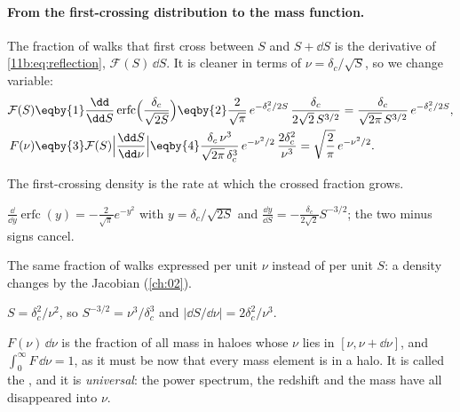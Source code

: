 \paragraph{From the first-crossing distribution to the mass function.}
The fraction of walks that first cross between $S$ and $S+\dd S$ is the derivative
of \eqref{11b:eq:reflection}, $\mathcal F(S)\,\dd S$. It is cleaner in terms of
$\nu=\delta_c/\sqrt S$, so we change variable:
\begin{align}
  \mathcal F(S)
  &\eqby{1}\frac{\dd}{\dd S}\operatorname{erfc}\Bigl(\frac{\delta_c}{\sqrt{2S}}\Bigr)
   \eqby{2}\frac{2}{\sqrt\pi}\,e^{-\delta_c^2/2S}\,
     \frac{\delta_c}{2\sqrt2\,S^{3/2}}
   =\frac{\delta_c}{\sqrt{2\pi}\,S^{3/2}}\,e^{-\delta_c^2/2S},\nonumber\\
  F(\nu)
  &\eqby{3}\mathcal F(S)\Bigl|\frac{\dd S}{\dd\nu}\Bigr|
   \eqby{4}\frac{\delta_c\,\nu^3}{\sqrt{2\pi}\,\delta_c^3}\,e^{-\nu^2/2}\,
     \frac{2\delta_c^2}{\nu^3}
   =\sqrt{\frac2\pi}\,e^{-\nu^2/2}.
  \label{11b:eq:fnu}
\end{align}
\begin{explain}
  \item The first-crossing density is the rate at which the crossed fraction
        grows.
  \item $\frac{\dd}{\dd y}\operatorname{erfc}(y)=-\frac{2}{\sqrt\pi}e^{-y^2}$ with
        $y=\delta_c/\sqrt{2S}$ and $\frac{\dd y}{\dd S}=-\frac{\delta_c}{2\sqrt2}S^{-3/2}$;
        the two minus signs cancel.
  \item The same fraction of walks expressed per unit $\nu$ instead of per unit
        $S$: a density changes by the Jacobian (\cref{ch:02}).
  \item $S=\delta_c^2/\nu^2$, so $S^{-3/2}=\nu^3/\delta_c^3$ and
        $|\dd S/\dd\nu|=2\delta_c^2/\nu^3$.
\end{explain}
$F(\nu)\,\dd\nu$ is the fraction of all mass in haloes whose $\nu$ lies in
$[\nu,\nu+\dd\nu]$, and $\int_0^\infty F\,\dd\nu=1$, as it must be now that every
mass element is in a halo. It is called the , and
it is \emph{universal}: the power spectrum, the redshift and the mass have all
disappeared into $\nu$.

